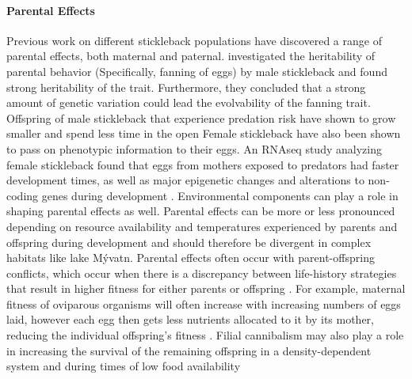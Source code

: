 \documentclass[12pt]{extarticle}
\begin{document}
\paragraph{Parental Effects}
Previous work on different stickleback populations have discovered a range of parental effects, both maternal and paternal. \citet{Bell2018} investigated the heritability of parental behavior (Specifically, fanning of eggs) by male stickleback and found strong heritability of the trait. Furthermore, they concluded that a strong amount of genetic variation could lead the evolvability of the fanning trait. Offspring of male stickleback that experience predation risk have shown to grow smaller and spend less time in the open \citep{Bell2016, Stein2014} Female stickleback have also been shown to pass on phenotypic information to their eggs. An RNAseq study analyzing female stickleback found that eggs from mothers exposed to predators had faster development times, as well as major epigenetic changes and alterations to non-coding genes during development \citep{Mommer2014, Bell2016}. Environmental components can play a role in shaping parental effects as well. Parental effects can be more or less pronounced depending on resource availability and temperatures experienced by parents and offspring during development \citep{Rasanen2007} and should therefore be divergent in complex habitats like lake M\'yvatn. Parental effects often occur with parent-offspring conflicts, which occur when there is a discrepancy between life-history strategies that result in higher fitness for either parents or offspring \citep{Uller2008}. For example, maternal fitness of oviparous organisms will often increase with increasing numbers of eggs laid, however each egg then gets less nutrients allocated to it by its mother, reducing the individual offspring's fitness \citep{Uller2008, Rasanen2007}. Filial cannibalism may also play a role in increasing the survival of the remaining offspring in a density-dependent system and during times of low food availability \citep{Bartrons2018} \\
\end{document}
